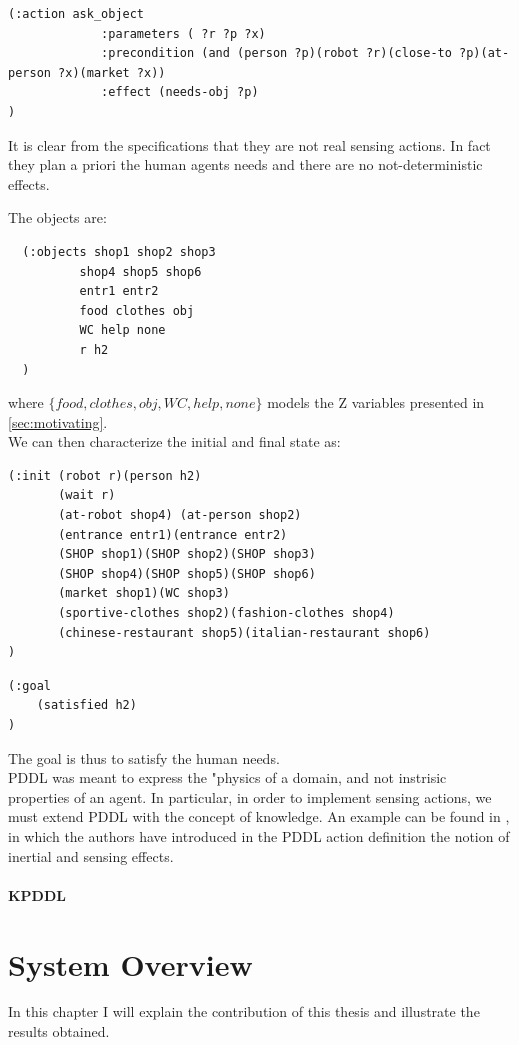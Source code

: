 \documentclass[pdftex,12pt,a4paper]{report}
\begin{document}
\begin{verbatim}
(:action ask_object 
             :parameters ( ?r ?p ?x)
             :precondition (and (person ?p)(robot ?r)(close-to ?p)(at-person ?x)(market ?x))
             :effect (needs-obj ?p)
)
\end{verbatim}

\noindent It is clear from the specifications that they are not real sensing actions. In fact they plan a priori the human agents needs and there are no not-deterministic effects.

The objects are:
\begin{verbatim}
  (:objects shop1 shop2 shop3
          shop4 shop5 shop6
          entr1 entr2
          food clothes obj
          WC help none
          r h2
  )
\end{verbatim}
\noindent where $\{food, clothes, obj, WC, help, none\}$ models the Z variables presented in \ref{sec:motivating}.\\
\noindent We can then characterize the initial and final state as:
\begin{verbatim}
(:init (robot r)(person h2)
       (wait r)
	   (at-robot shop4) (at-person shop2)
       (entrance entr1)(entrance entr2)
       (SHOP shop1)(SHOP shop2)(SHOP shop3)
       (SHOP shop4)(SHOP shop5)(SHOP shop6)
       (market shop1)(WC shop3)
       (sportive-clothes shop2)(fashion-clothes shop4)
       (chinese-restaurant shop5)(italian-restaurant shop6)
)
\end{verbatim}

\begin{verbatim}
(:goal
    (satisfied h2)
)
\end{verbatim}
\noindent The goal is thus to satisfy the human needs. \\
\noindent PDDL was meant to express the "physics of a domain, and not instrisic properties of an agent.
In particular, in order to implement sensing actions, we must extend PDDL with the concept of knowledge. An example can be found in \cite{iocchi2003},%
in which the authors have introduced in the PDDL action definition the notion of inertial and sensing effects.

\subsubsection{KPDDL}

\chapter{System Overview}
In this chapter I will explain the contribution of this thesis and illustrate the results obtained.\\
\newline
\end{document}
